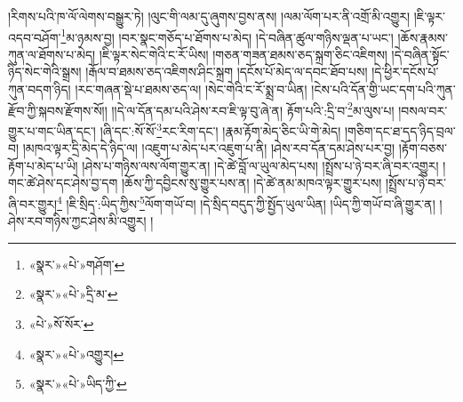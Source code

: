 །རིགས་པའི་ཁ་ལོ་ལེགས་བསྒྱུར་ཏེ། །ལུང་གི་ལམ་དུ་ཞུགས་བྱས་ནས། །ལམ་ལོག་པར་ནི་འགྲོ་མི་འགྱུར། །ཇི་ལྟར་འདབ་བཤོག་\footnote{«སྣར་»«པེ་»གཤོག་}མ་ཉམས་བྱ། །བར་སྣང་གཅོད་པ་ཐོགས་པ་མེད། །དེ་བཞིན་ཚུལ་གཉིས་ལྡན་པ་ཡང་། །ཆོས་རྣམས་ཀུན་ལ་ཐོགས་པ་མེད། །ཇི་ལྟར་སེང་གེའི་ང་རོ་ཡིས། །གཅན་གཟན་ཐམས་ཅད་སྐྲག་ཅིང་འཇིགས། །དེ་བཞིན་སྟོང་ཉིད་སེང་གེའི་སྒྲས། །རྒོལ་བ་ཐམས་ཅད་འཇིགས་ཤིང་སྐྲག །དངོས་པོ་མེད་ལ་དབང་ཐོབ་པས། །དེ་ཕྱིར་དངོས་པོ་ཀུན་བདག་ཉིད། །རང་གཞན་སྡེ་པ་ཐམས་ཅད་ལ། །སེང་གེའི་ང་རོ་སྨྲ་བ་ཡིན། །ངེས་པའི་དོན་གྱི་ཡང་དག་པའི་ཀུན་རྫོབ་ཀྱི་སྐབས་རྫོགས་སོ།། །།དེ་ལ་དོན་དམ་པའི་ཤེས་རབ་ཇི་ལྟ་བུ་ཞེ་ན། རྟོག་པའི་:དྲི་བ་\footnote{«སྣར་»«པེ་»དྲི་མ་}མ་ལུས་པ། །བསལ་བར་གྱུར་པ་གང་ཡིན་དང་། །ཞི་དང་:སོ་སོ་\footnote{«པེ་»སོ་སོར་}རང་རིག་དང་། །རྣམ་རྟོག་མེད་ཅིང་ཡི་གེ་མེད། །གཅིག་དང་ཐ་དད་ཉིད་བྲལ་བ། །མཁའ་ལྟར་དྲི་མེད་དེ་ཉིད་ལ། །འཇུག་པ་མེད་པར་འཇུག་པ་ནི། །ཤེས་རབ་དོན་དམ་ཤེས་པར་བྱ། །རྟོག་བཅས་རྟོག་པ་མེད་པ་ཡི། །ཤེས་པ་གཉིས་ལས་ལོག་གྱུར་ན། །དེ་ཚེ་བློ་ལ་ཡུལ་མེད་པས། །སྤྲོས་པ་ཉེ་བར་ཞི་བར་འགྱུར། །གང་ཚེ་ཤེས་དང་ཤེས་བྱ་དག །ཆོས་ཀྱི་དབྱིངས་སུ་གྱུར་པས་ན། །དེ་ཚེ་ནམ་མཁའ་ལྟར་གྱུར་པས། །སྤྲོས་པ་ཉེ་བར་ཞི་བར་གྱུར།\footnote{«སྣར་»«པེ་»འགྱུར།} །ཇི་སྲིད་:ཡིད་ཀྱིས་\footnote{«སྣར་»«པེ་»ཡིད་ཀྱི་}ལོག་གཡོ་བ། །དེ་སྲིད་བདུད་ཀྱི་སྤྱོད་ཡུལ་ཡིན། །ཡིད་ཀྱི་གཡོ་བ་ཞི་གྱུར་ན། །ཤེས་རབ་གཉིས་ཀྱང་ཤེས་མི་འགྱུར། །
